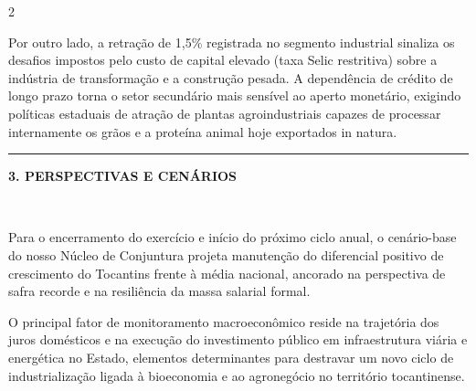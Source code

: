 \documentclass[10pt,a4paper]{article}
\newcommand{\secaoperiodico}[1]{%
  \vspace{4pt}%
  \noindent\colorbox{corfundo}{%
    \parbox{\dimexpr\columnwidth-2\fboxsep\relax}{%
      \vspace{3pt}%
      \textcolor{douradoto}{\rule{4pt}{9pt}}\hspace{6pt}%
      \textcolor{corprimaria}{\textbf{\small \MakeUppercase{#1}}}%
      \vspace{2pt}%
    }%
  }\\[-2pt]%
  \noindent{\color{corprimaria}\rule{\columnwidth}{1pt}}%
  \vspace{3pt}\par%
}
\begin{document}
\begin{multicols}{2}
\vspace{4pt}

Por outro lado, a retração de 1,5\% registrada no segmento industrial sinaliza os desafios impostos pelo custo de capital elevado (taxa Selic restritiva) sobre a indústria de transformação e a construção pesada. A dependência de crédito de longo prazo torna o setor secundário mais sensível ao aperto monetário, exigindo políticas estaduais de atração de plantas agroindustriais capazes de processar internamente os grãos e a proteína animal hoje exportados in natura.

\secaoperiodico{3. Perspectivas e Cenários}

Para o encerramento do exercício e início do próximo ciclo anual, o cenário-base do nosso Núcleo de Conjuntura projeta manutenção do diferencial positivo de crescimento do Tocantins frente à média nacional, ancorado na perspectiva de safra recorde e na resiliência da massa salarial formal.

\vspace{4pt}

O principal fator de monitoramento macroeconômico reside na trajetória dos juros domésticos e na execução do investimento público em infraestrutura viária e energética no Estado, elementos determinantes para destravar um novo ciclo de industrialização ligada à bioeconomia e ao agronegócio no território tocantinense.
\end{multicols}

\vspace{4pt}
\end{document}
